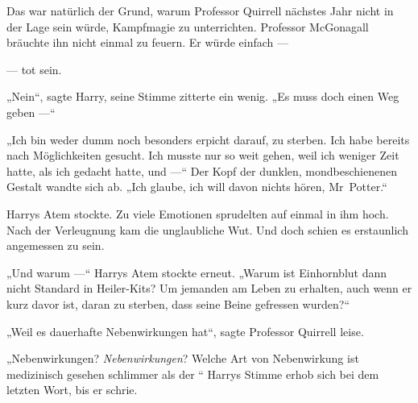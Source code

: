 Das war natürlich der Grund, warum Professor Quirrell nächstes Jahr nicht in der Lage sein würde, Kampfmagie zu unterrichten. Professor McGonagall bräuchte ihn nicht einmal zu feuern. Er würde einfach —

— tot sein.

„Nein“, sagte Harry, seine Stimme zitterte ein wenig.
„Es muss doch einen Weg geben —“

„Ich bin weder dumm noch besonders erpicht darauf, zu sterben. Ich habe bereits nach Möglichkeiten gesucht. Ich musste nur so weit gehen, weil ich weniger Zeit hatte, als ich gedacht hatte, und —“ Der Kopf der dunklen, mondbeschienenen Gestalt wandte sich ab.
„Ich glaube, ich will davon nichts hören, Mr~Potter.“

Harrys Atem stockte. Zu viele Emotionen sprudelten auf einmal in ihm hoch. Nach der Verleugnung kam die unglaubliche Wut. Und doch schien es erstaunlich angemessen zu sein.

„Und warum —“ Harrys Atem stockte erneut.
„Warum ist Einhornblut dann nicht Standard in Heiler-Kits? Um jemanden am Leben zu erhalten, auch wenn er kurz davor ist, daran zu sterben, dass seine Beine gefressen wurden?“

„Weil es dauerhafte Nebenwirkungen hat“, sagte Professor Quirrell leise.

„Nebenwirkungen? \emph{Nebenwirkungen}? Welche Art von Nebenwirkung ist medizinisch gesehen schlimmer als der “ Harrys Stimme erhob sich bei dem letzten Wort, bis er schrie.

